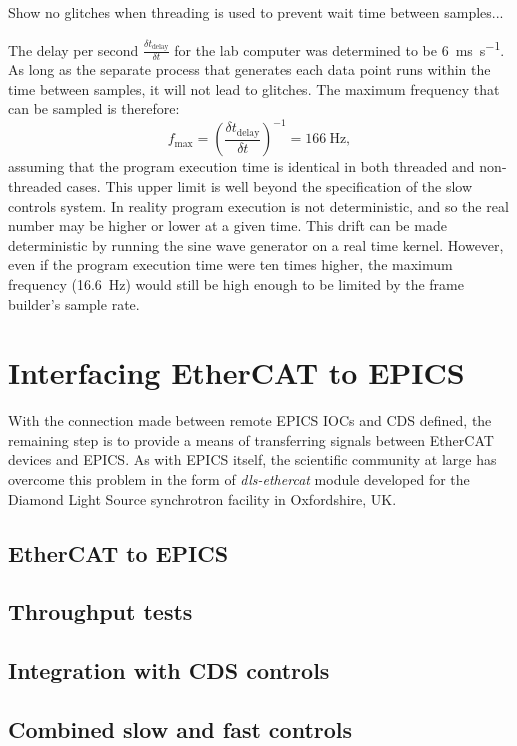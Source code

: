 Show no glitches when threading is used to prevent wait time between samples...

The delay per second $\frac{\delta t_{\text{delay}}}{\delta t}$ for the lab computer was determined to be \SI{6}{\milli\second\per\second}. As long as the separate process that generates each data point runs within the time between samples, it will not lead to glitches. The maximum frequency that can be sampled is therefore:
\begin{equation}
  f_{\text{max}} = \left(\frac{\delta t_{\text{delay}}}{\delta t}\right)^{-1} = \SI{166}{\hertz},
\end{equation}
assuming that the program execution time is identical in both threaded and non-threaded cases. This upper limit is well beyond the specification of the slow controls system. In reality program execution is not deterministic, and so the real number may be higher or lower at a given time. This drift can be made deterministic by running the sine wave generator on a real time kernel. However, even if the program execution time were ten times higher, the maximum frequency (\SI{16.6}{\hertz}) would still be high enough to be limited by the frame builder's sample rate.

\section{Interfacing EtherCAT to EPICS}
With the connection made between remote \gls{EPICS} \glspl{IOC} and \gls{CDS} defined, the remaining step is to provide a means of transferring signals between EtherCAT devices and \gls{EPICS}. As with \gls{EPICS} itself, the scientific community at large has overcome this problem in the form of \emph{dls-ethercat} module developed for the Diamond Light Source synchrotron facility in Oxfordshire, UK.

\subsection{EtherCAT to EPICS}

\subsection{Throughput tests}

\subsection{Integration with CDS controls}

\subsection{Combined slow and fast controls}
